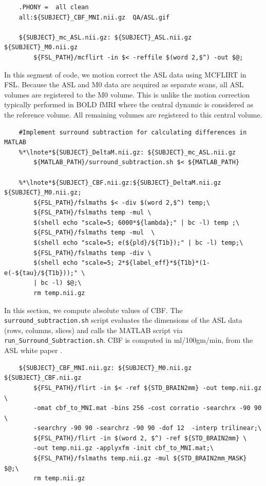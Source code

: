 \begin{lstlisting}
	.PHONY =  all clean
	all:${SUBJECT}_CBF_MNI.nii.gz  QA/ASL.gif
	
	${SUBJECT}_mc_ASL.nii.gz: ${SUBJECT}_ASL.nii.gz ${SUBJECT}_M0.nii.gz
		${FSL_PATH}/mcflirt -in $< -reffile $(word 2,$^) -out $@;
\end{lstlisting}

In this segment of code, we motion correct the ASL data using MCFLIRT in FSL. Because the ASL and M0 data are acquired as separate scans, all ASL volumes are registered to the M0 volume. This is unlike the motion correction typically performed in BOLD fMRI where the central dynamic is considered as the reference volume. All remaining volumes are registered to this central volume.

\begin{lstlisting}
	#Implement surround subtraction for calculating differences in MATLAB
	%*\lnote*${SUBJECT}_DeltaM.nii.gz: ${SUBJECT}_mc_ASL.nii.gz 
		${MATLAB_PATH}/surround_subtraction.sh $< ${MATLAB_PATH} 
	
	%*\lnote*${SUBJECT}_CBF.nii.gz:${SUBJECT}_DeltaM.nii.gz ${SUBJECT}_M0.nii.gz;
		${FSL_PATH}/fslmaths $< -div $(word 2,$^) temp;\
		${FSL_PATH}/fslmaths temp -mul \
		$(shell echo "scale=5; 6000*${lambda};" | bc -l) temp ;\
		${FSL_PATH}/fslmaths temp -mul  \
		$(shell echo "scale=5; e(${pld}/${T1b});" | bc -l) temp;\
		${FSL_PATH}/fslmaths temp -div \
		$(shell echo "scale=5; 2*${label_eff}*${T1b}*(1-e(-${tau}/${T1b}));" \
		| bc -l) $@;\
		rm temp.nii.gz
\end{lstlisting}

In this section, we compute absolute values of CBF.  The \texttt{surround_subtraction.sh} script evaluates the dimensions of the ASL data (rows, columns, slices) and calls the MATLAB script via \texttt{run_Surround_Subtraction.sh}.  CBF is computed in ml/100gm/min, from the ASL white paper \citep{ASLdementia}. 

\begin{lstlisting}
	${SUBJECT}_CBF_MNI.nii.gz: ${SUBJECT}_M0.nii.gz ${SUBJECT}_CBF.nii.gz
		${FSL_PATH}/flirt -in $< -ref ${STD_BRAIN2mm} -out temp.nii.gz \
		-omat cbf_to_MNI.mat -bins 256 -cost corratio -searchrx -90 90 \
		-searchry -90 90 -searchrz -90 90 -dof 12  -interp trilinear;\
		${FSL_PATH}/flirt -in $(word 2, $^) -ref ${STD_BRAIN2mm} \
		-out temp.nii.gz -applyxfm -init cbf_to_MNI.mat;\
		${FSL_PATH}/fslmaths temp.nii.gz -mul ${STD_BRAIN2mm_MASK} $@;\
		rm temp.nii.gz
\end{lstlisting}

